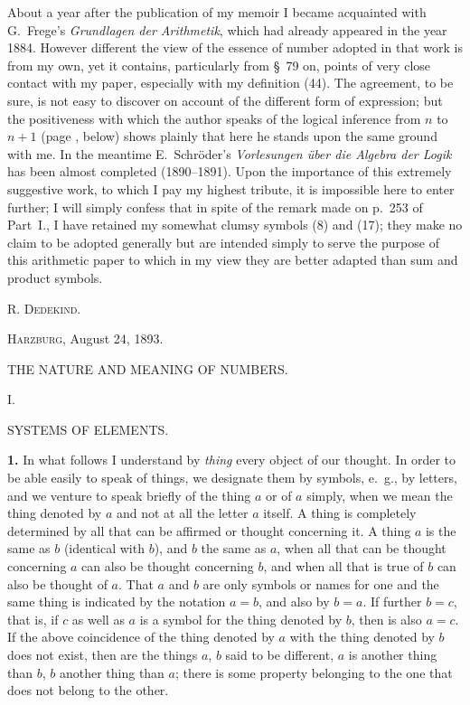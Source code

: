 \documentclass[oneside]{book}
\makeatletter
\newcommand\mypara{\medskip\textbf}
\newcommand\mysect[3]{
\medskip\begin{center}{\large #2.}\end{center}
\begin{center}\uppercase{#3.}\end{center}
\addcontentsline{toc}{section}{\protect\phantom{#1}#2\@. #3}
}
\makeatother
\begin{document}
About a year after the publication of my memoir
I became acquainted with G.~Frege's \textit{Grundlagen der
Arithmetik}, which had already appeared in the year
1884. However different the view of the essence of
number adopted in that work is from my own, yet it
contains, particularly from §~79 on, points of very
close contact with my paper, especially with my definition
(44). The agreement, to be sure, is not easy
to discover on account of the different form of expression;
but the positiveness with which the author
speaks of the logical inference from $n$ to $n+1$ (page
\pageref{Ind132}, below) shows plainly that here he stands upon the
same ground with me. In the meantime E.~Schröder's
\textit{Vorlesungen über die Algebra der Logik} has been almost
completed (1890--1891). Upon the importance of this
extremely suggestive work, to which I pay my highest
tribute, it is impossible here to enter further; I will
simply confess that in spite of the remark made on
p.~253 of Part~I., I have retained my somewhat clumsy
symbols (8) and (17); they make no claim to be
adopted generally but are intended simply to serve
the purpose of this arithmetic paper to which in my
view they are better adapted than sum and product
symbols.

\begin{flushright}
\textsc{R. Dedekind.}\mbox\qquad
\end{flushright}

\textsc{Harzburg}, August 24, 1893.

\newpage
\begin{center}
\large THE NATURE AND MEANING OF NUMBERS.
\end{center}


\mysect{XVII}{I}{Systems of Elements}

\mypara{1.} In what follows I understand by \textit{thing} every
object of our thought. In order to be able easily to
speak of things, we designate them by symbols, e.~g.,
by letters, and we venture to speak briefly of the
thing $a$ or of $a$ simply, when we mean the thing denoted
by $a$ and not at all the letter $a$ itself. A thing
is completely determined by all that can be affirmed
or thought concerning it. A thing $a$ is the same as $b$
(identical with $b$), and $b$ the same as $a$, when all that
can be thought concerning $a$ can also be thought concerning
$b$, and when all that is true of $b$ can also be
thought of $a$. That $a$ and $b$ are only symbols or names
for one and the same thing is indicated by the notation
$a=b$, and also by $b=a$. If further $b=c$, that
is, if $c$ as well as $a$ is a symbol for the thing denoted
by $b$, then is also $a=c$. If the above coincidence of
the thing denoted by $a$ with the thing denoted by $b$
does not exist, then are the things $a$, $b$ said to be different,
$a$ is another thing than $b$, $b$ another thing than
$a$; there is some property belonging to the one that
does not belong to the other.
\end{document}
